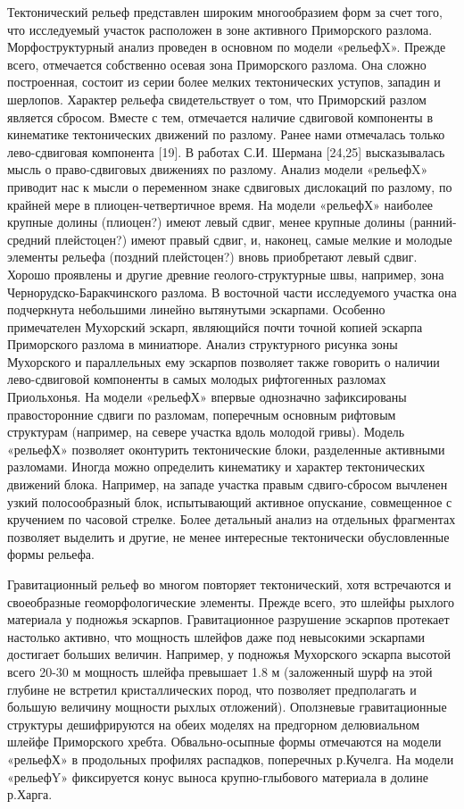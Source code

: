 \documentclass[runningheads]{AIIT}
\begin{document}
Тектонический рельеф представлен широким многообразием форм за счет того, что исследуемый участок расположен в зоне активного Приморского разлома. Морфоструктурный анализ проведен в основном по модели «рельефX». Прежде всего, отмечается собственно осевая зона Приморского разлома. Она сложно построенная, состоит из серии более мелких тектонических уступов, западин и шерлопов. Характер рельефа свидетельствует о том, что Приморский разлом является сбросом. Вместе с тем, отмечается наличие сдвиговой компоненты в кинематике тектонических движений по разлому.
Ранее нами отмечалась только лево-сдвиговая компонента [19]. В работах С.И. Шермана [24,25] высказывалась мысль о право-сдвиговых движениях по разлому. Анализ модели «рельефX» приводит нас к мысли о переменном знаке сдвиговых дислокаций по разлому, по крайней мере в плиоцен-четвертичное время. На модели «рельефХ» наиболее крупные долины (плиоцен?) имеют левый сдвиг, менее крупные долины (ранний-средний плейстоцен?) имеют правый сдвиг, и, наконец, самые мелкие и молодые элементы рельефа (поздний плейстоцен?) вновь приобретают левый сдвиг.
Хорошо проявлены и другие древние геолого-структурные швы, например, зона Чернорудско-Баракчинского разлома. В восточной части исследуемого участка она подчеркнута небольшими линейно вытянутыми эскарпами. Особенно примечателен Мухорский эскарп, являющийся почти точной копией эскарпа Приморского разлома в миниатюре. Анализ структурного рисунка зоны Мухорского и параллельных ему эскарпов позволяет также говорить о наличии лево-сдвиговой компоненты в самых молодых рифтогенных разломах Приольхонья. На модели «рельефХ» впервые однозначно зафиксированы правосторонние сдвиги по разломам, поперечным основным рифтовым структурам (например, на севере участка вдоль молодой гривы).
Модель «рельефХ» позволяет оконтурить тектонические блоки, разделенные активными разломами. Иногда можно определить кинематику и характер тектонических движений блока. Например, на западе участка правым сдвиго-сбросом вычленен узкий полосообразный блок, испытывающий активное опускание, совмещенное с кручением по часовой стрелке.
Более детальный анализ на отдельных фрагментах позволяет выделить и другие, не менее интересные тектонически обусловленные формы рельефа.

Гравитационный рельеф во многом повторяет тектонический, хотя встречаются и своеобразные геоморфологические элементы. Прежде всего, это шлейфы рыхлого материала у подножья эскарпов. Гравитационное разрушение эскарпов протекает настолько активно, что мощность шлейфов даже под невысокими эскарпами достигает больших величин. Например, у подножья Мухорского эскарпа высотой всего 20-30 м мощность шлейфа превышает 1.8 м (заложенный шурф на этой глубине не встретил кристаллических пород, что позволяет предполагать и большую величину мощности рыхлых отложений). Оползневые гравитационные структуры дешифрируются на обеих моделях на предгорном делювиальном шлейфе Приморского хребта. Обвально-осыпные формы отмечаются на модели «рельефХ» в продольных профилях распадков, поперечных р.Кучелга. На модели «рельефY» фиксируется конус выноса крупно-глыбового материала в долине р.Харга.
\end{document}
